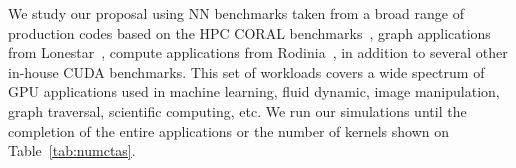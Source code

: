 We study our proposal using NN benchmarks taken from a broad range of production codes based on the HPC CORAL benchmarks~\cite{coral}, graph applications from Lonestar~\cite{lonestar}, compute applications from Rodinia~\cite{Che2009}, in addition to several other in-house CUDA benchmarks. This set of workloads covers a wide spectrum of GPU applications used in machine learning, fluid dynamic, image manipulation, graph traversal, scientific computing, etc. We run our simulations until the completion of the entire applications or the number of kernels shown on Table~\ref{tab:numctas}.


